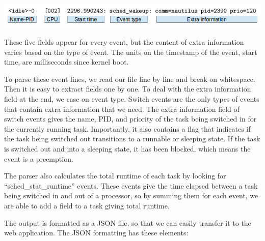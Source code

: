 \documentclass{hmcclinic}
\begin{document}
  \includegraphics[scale=0.4]{parserExample.png}

  These five fields appear for every event, but the content of extra information
  varies based on the type of event. The units on the timestamp of the event,
  start time, are milliseconds since kernel boot.

  To parse these event lines, we read our file line by line and break on
  whitespace. Then it is easy to extract fields one by one. To deal with the
  extra information field at the end, we case on event type. Switch events
  are the only types of events that contain extra information that we need.  The
  extra information field of switch events gives the name, PID, and priority of
  the task being switched in for the currently running task. Importantly, it
  also contains a flag that indicates if the task being switched out transitions
  to a runnable or sleeping state. If the task is switched out and into a
  sleeping state, it has been blocked, which means the event is a preemption.

  The parser also calculates the total runtime of each task by looking for
  ``sched\_stat\_runtime'' events. These events give the time elapsed between
  a task being switched in and out of a processor, so by summing them for 
  each event, we are able to add a field to a task giving total runtime.

  The output is formatted as a JSON file, so that we can easily transfer it to
  the web application. The JSON formatting has these elements:
\end{document}
